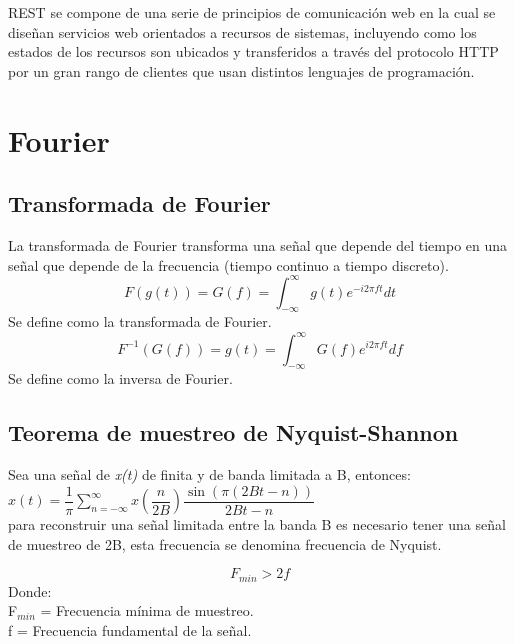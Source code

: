 REST se compone de una serie de principios de comunicación web en la cual se diseñan servicios web orientados a recursos de sistemas, incluyendo como los estados de los recursos son ubicados y transferidos a través del protocolo HTTP por un gran rango de clientes que usan distintos lenguajes de programación.  \cite{A37}


\section{Fourier}
\subsection{Transformada de Fourier}
La transformada de Fourier transforma una señal que depende del tiempo en una señal que depende de la frecuencia (tiempo continuo a tiempo discreto).
\begin{equation}
F(g(t))=G(f)=\int_{-\infty}^{\infty}g(t)e^{-i2\pi ft}dt   
\end{equation}
Se define como la transformada de Fourier. \cite{A34}
\begin{equation}
F^{-1}(G(f))=g(t)=\int_{-\infty}^{\infty}G(f)e^{i2\pi ft}df   
\end{equation} 
Se define como  la inversa de Fourier. \cite{A34}

\subsection{Teorema de muestreo de Nyquist-Shannon}
Sea una señal de \textit{x(t)} de  finita y de banda  limitada  a B, entonces:
\\

$x(t)=\dfrac{1}{\pi}\sum_{n=-\infty}^{\infty} x(\dfrac{n}{2B})\dfrac{\sin(\pi(2Bt-n)) }{2Bt-n}$
\cite{A35}\\

para reconstruir una señal limitada entre la banda B es necesario tener una señal de muestreo de 2B, esta frecuencia se denomina frecuencia de Nyquist.

\begin{equation}
F_{min}>2f
\end{equation}
Donde:\\
F$_{min}$ = Frecuencia mínima de muestreo.\\
f = Frecuencia fundamental de la señal.

